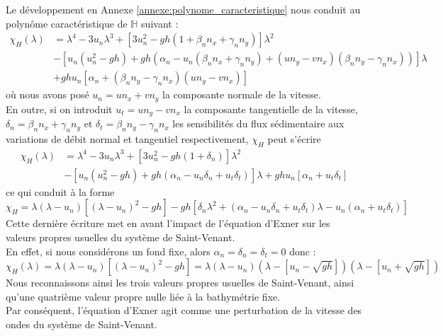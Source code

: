 \documentclass[11pt, a4paper, oneside]{report}
\begin{document}
Le développement en Annexe \ref{annexe:polynome_caracteristique} nous conduit au polynôme caractéristique de $\mathbb{H}$ suivant :
\begin{equation}
    \begin{aligned}
        \chi_H(\lambda) & = \lambda^4 - 3u_n \lambda^3 + \left[ 3 u_n^2 -gh(1 + \beta_n n_x + \gamma_n n_y) \right] \lambda^2 \\
        & - \left[ u_n(u_n^2 - gh) + gh \left( \alpha_n - u_n(\beta_n n_x + \gamma_n n_y) + (u n_y - v n_x)(\beta_n n_y - \gamma_n n_x) \right) \right] \lambda \\
        & + gh u_n \left[ \alpha_n + (\beta_n n_y - \gamma_n n_x)(u n_y - v n_x) \right]
    \end{aligned}
\end{equation}
où nous avons posé $u_n = u n_x + v n_y$ la composante normale de la vitesse. \\
En outre, si on introduit $u_t = u n_y - v n_x$ la composante tangentielle de la vitesse, $\delta_n = \beta_n n_x + \gamma_n n_y$ et $\delta_t = \beta_n n_y - \gamma_n n_x$ les sensibilités du flux sédimentaire aux variations de débit normal et tangentiel respectivement, $\chi_H$ peut s'écrire
\begin{equation}
    \begin{aligned}
        \chi_H(\lambda) & = \lambda^4 - 3u_n \lambda^3 + \left[ 3 u_n^2 -gh(1 + \delta_n) \right] \lambda^2 \\
        & - \left[ u_n(u_n^2 - gh) + gh \left( \alpha_n - u_n \delta_n + u_t \delta_t \right) \right] \lambda + gh u_n \left[ \alpha_n + u_t \delta_t \right]
    \end{aligned}
\end{equation}
ce qui conduit à la forme
\begin{equation} \label{eq:Polynome_caracteristique}
    \chi_H = \lambda(\lambda - u_n) \left[ (\lambda - u_n)^2 - gh \right] - gh \left[ \delta_n \lambda^2 + \left( \alpha_n - u_n \delta_n + u_t \delta_t \right) \lambda - u_n \left( \alpha_n + u_t \delta_t \right) \right]
\end{equation}
Cette dernière écriture met en avant l'impact de l'équation d'Exner sur les valeurs propres usuelles du système de Saint-Venant. \\
En effet, si nous considérons un fond fixe, alors $\alpha_n = \delta_n = \delta_t = 0$ donc :
\begin{equation}
    \chi_H(\lambda) = \lambda(\lambda - u_n) \left[ (\lambda - u_n)^2 - gh \right] = \lambda (\lambda - u_n) \left( \lambda - \left[u_n - \sqrt{gh}\right] \right) \left( \lambda - \left[ u_n + \sqrt{gh} \right] \right)
\end{equation}
Nous reconnaissons ainsi les trois valeurs propres usuelles de Saint-Venant, ainsi qu'une quatrième valeur propre nulle liée à la bathymétrie fixe. \\
Par conséquent, l'équation d'Exner agit comme une perturbation de la vitesse des ondes du système de Saint-Venant. \\
\end{document}
